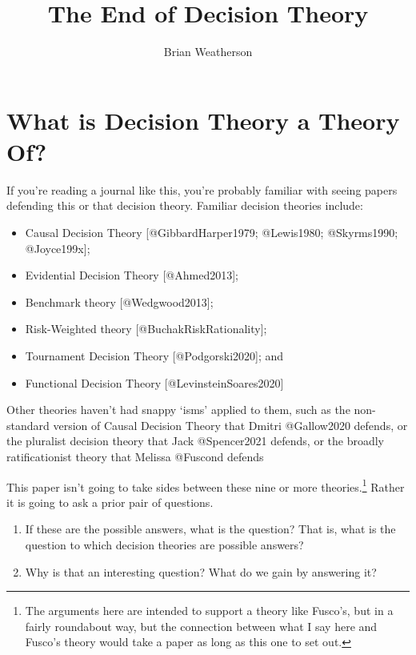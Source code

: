 \documentclass[
  letterpaper,
  DIV=11,
  numbers=noendperiod]{scrartcl}
\title{The End of Decision Theory}
\author{Brian Weatherson}
\date{}
\providecommand{\tightlist}{%
  \setlength{\itemsep}{0pt}\setlength{\parskip}{0pt}}\usepackage{longtable,booktabs,array}
\begin{document}
\maketitle

\section{What is Decision Theory a Theory
Of?}\label{what-is-decision-theory-a-theory-of}

If you're reading a journal like this, you're probably familiar with
seeing papers defending this or that decision theory. Familiar decision
theories include:

\begin{itemize}
\tightlist
\item
  Causal Decision Theory {[}@GibbardHarper1979; @Lewis1980; @Skyrms1990;
  @Joyce199x{]};
\item
  Evidential Decision Theory {[}@Ahmed2013{]};
\item
  Benchmark theory {[}@Wedgwood2013{]};
\item
  Risk-Weighted theory {[}@BuchakRiskRationality{]};
\item
  Tournament Decision Theory {[}@Podgorski2020{]}; and
\item
  Functional Decision Theory {[}@LevinsteinSoares2020{]}
\end{itemize}

Other theories haven't had snappy `isms' applied to them, such as the
non-standard version of Causal Decision Theory that Dmitri @Gallow2020
defends, or the pluralist decision theory that Jack @Spencer2021
defends, or the broadly ratificationist theory that Melissa @Fuscond
defends

This paper isn't going to take sides between these nine or more
theories.\footnote{The arguments here are intended to support a theory
  like Fusco's, but in a fairly roundabout way, but the connection
  between what I say here and Fusco's theory would take a paper as long
  as this one to set out.} Rather it is going to ask a prior pair of
questions.

\begin{enumerate}
\def\labelenumi{\arabic{enumi}.}
\tightlist
\item
  If these are the possible answers, what is the question? That is, what
  is the question to which decision theories are possible answers?
\item
  Why is that an interesting question? What do we gain by answering it?
\end{enumerate}
\end{document}
